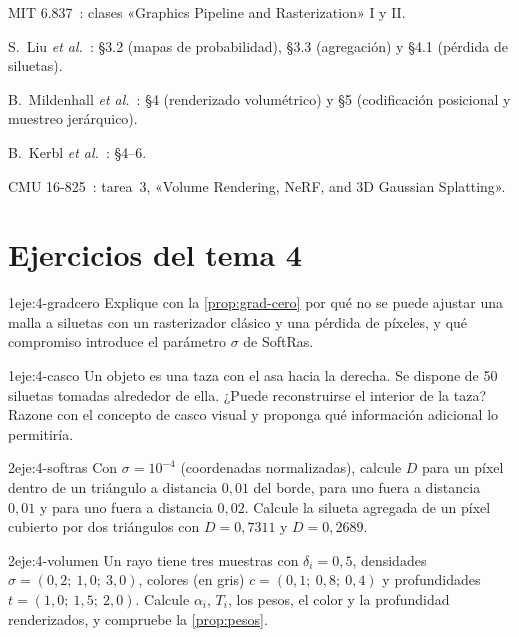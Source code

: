 \begin{lecturas}
\item MIT 6.837~\cite{mit6837}: clases «Graphics Pipeline and Rasterization» I y II.
\item S.~Liu \emph{et al.}~\cite{softras}: §3.2 (mapas de probabilidad), §3.3 (agregación) y §4.1 (pérdida de siluetas).
\item B.~Mildenhall \emph{et al.}~\cite{nerf}: §4 (renderizado volumétrico) y §5 (codificación posicional y muestreo jerárquico).
\item B.~Kerbl \emph{et al.}~\cite{gs}: §4--6.
\item CMU 16-825~\cite{cmu16825}: tarea~3, «Volume Rendering, NeRF, and 3D Gaussian Splatting».
\end{lecturas}

\section*{Ejercicios del tema 4}

\begin{ejercicio}{1}{eje:4-gradcero}
Explique con la \cref{prop:grad-cero} por qué no se puede ajustar una malla a siluetas con un rasterizador clásico y una pérdida de píxeles, y qué compromiso introduce el parámetro $\sigma$ de SoftRas.
\end{ejercicio}

\begin{ejercicio}{1}{eje:4-casco}
Un objeto es una taza con el asa hacia la derecha. Se dispone de 50 siluetas tomadas alrededor de ella. ¿Puede reconstruirse el interior de la taza? Razone con el concepto de casco visual y proponga qué información adicional lo permitiría.
\end{ejercicio}

\begin{ejercicio}{2}{eje:4-softras}
Con $\sigma=10^{-4}$ (coordenadas normalizadas), calcule $D$ para un píxel dentro de un triángulo a distancia $0{,}01$ del borde, para uno fuera a distancia $0{,}01$ y para uno fuera a distancia $0{,}02$. Calcule la silueta agregada de un píxel cubierto por dos triángulos con $D=0{,}7311$ y $D=0{,}2689$.
\end{ejercicio}

\begin{ejercicio}{2}{eje:4-volumen}
Un rayo tiene tres muestras con $\delta_i=0{,}5$, densidades $\sigma=(0{,}2;\ 1{,}0;\ 3{,}0)$, colores (en gris) $c=(0{,}1;\ 0{,}8;\ 0{,}4)$ y profundidades $t=(1{,}0;\ 1{,}5;\ 2{,}0)$. Calcule $\alpha_i$, $T_i$, los pesos, el color y la profundidad renderizados, y compruebe la \cref{prop:pesos}.
\end{ejercicio}

